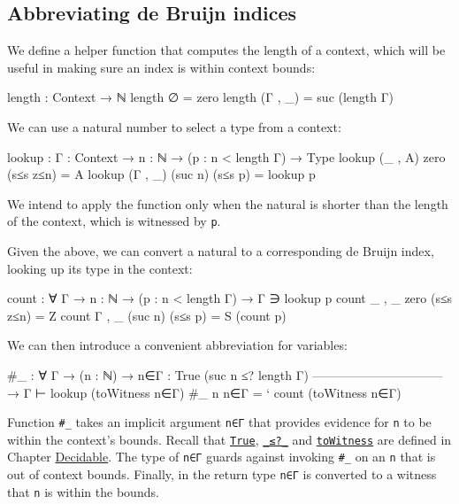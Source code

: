 \hypertarget{abbreviating-de-bruijn-indices}{%
\subsection{Abbreviating de Bruijn
indices}\label{abbreviating-de-bruijn-indices}}

We define a helper function that computes the length of a context, which
will be useful in making sure an index is within context bounds:

\begin{fence}
\begin{code}
length : Context → ℕ
length ∅        =  zero
length (Γ , _)  =  suc (length Γ)
\end{code}
\end{fence}

We can use a natural number to select a type from a context:

\begin{fence}
\begin{code}
lookup : {Γ : Context} → {n : ℕ} → (p : n < length Γ) → Type
lookup {(_ , A)} {zero}    (s≤s z≤n)  =  A
lookup {(Γ , _)} {(suc n)} (s≤s p)    =  lookup p
\end{code}
\end{fence}

We intend to apply the function only when the natural is shorter than
the length of the context, which is witnessed by \texttt{p}.

Given the above, we can convert a natural to a corresponding de Bruijn
index, looking up its type in the context:

\begin{fence}
\begin{code}
count : ∀ {Γ} → {n : ℕ} → (p : n < length Γ) → Γ ∋ lookup p
count {_ , _} {zero}    (s≤s z≤n)  =  Z
count {Γ , _} {(suc n)} (s≤s p)    =  S (count p)
\end{code}
\end{fence}

We can then introduce a convenient abbreviation for variables:

\begin{fence}
\begin{code}
#_ : ∀ {Γ}
  → (n : ℕ)
  → {n∈Γ : True (suc n ≤? length Γ)}
    --------------------------------
  → Γ ⊢ lookup (toWitness n∈Γ)
#_ n {n∈Γ}  =  ` count (toWitness n∈Γ)
\end{code}
\end{fence}

Function \texttt{\#\_} takes an implicit argument \texttt{n∈Γ} that
provides evidence for \texttt{n} to be within the context's bounds.
Recall that
\protect\hyperlink{Decidable-proof-by-reflection}{\texttt{True}},
\protect\hyperlink{Decidable-the-best-of-both-worlds}{\texttt{\_≤?\_}}
and
\protect\hyperlink{Decidable-decidables-from-booleans-and-booleans-from-decidables}{\texttt{toWitness}}
are defined in Chapter \protect\hyperlink{Decidable}{Decidable}. The
type of \texttt{n∈Γ} guards against invoking \texttt{\#\_} on an
\texttt{n} that is out of context bounds. Finally, in the return type
\texttt{n∈Γ} is converted to a witness that \texttt{n} is within the
bounds.

